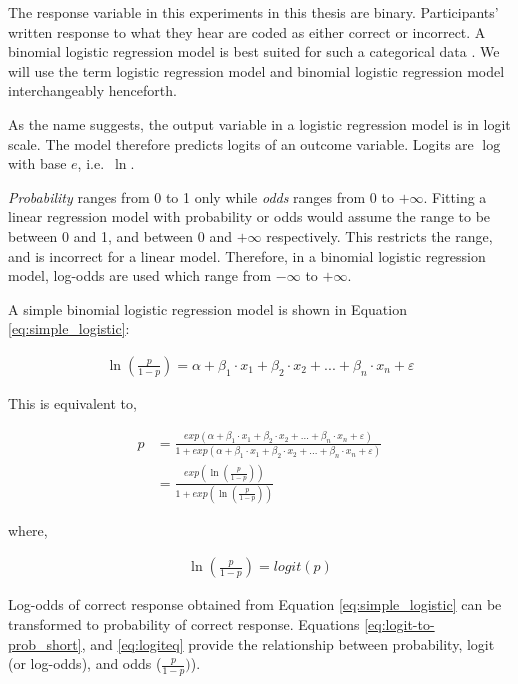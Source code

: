 \documentclass[a4paper, nobind]{templates/ociamthesis}
\begin{document}
The response variable in this experiments in this thesis are binary.
Participants' written response to what they hear are coded as either correct or incorrect.
A binomial logistic regression model is best suited for such a categorical data \autocite{Jaeger2008}.
We will use the term logistic regression model and binomial logistic regression model interchangeably henceforth.

As the name suggests, the output variable in a logistic regression model is in logit scale.
The model therefore predicts logits of an outcome variable.
Logits are \(\log\) with base \(e\), i.e.~\(\ln\).

\emph{Probability} ranges from 0 to 1 only while \emph{odds} ranges from 0 to \(+\infty\).
Fitting a linear regression model with probability or odds would assume the range to be between 0 and 1, and between 0 and \(+\infty\) respectively.
This restricts the range, and is incorrect for a linear model.
Therefore, in a binomial logistic regression model, log-odds are used which range from \(-\infty\) to \(+\infty\).

A simple binomial logistic regression model is shown in Equation \ref{eq:simple_logistic}:

\begin{align} \label{eq:simple_logistic}
\ln(\frac{p}{1-p}) =
\alpha + 
\beta_{1}\cdot{x_1} + 
\beta_{2}\cdot{x_2} + ... +
\beta_{n}\cdot{x_n} + \varepsilon
\end{align}

This is equivalent to,

\begin{align} \label{eq:logit-to-prob_long}
p &=
{\frac{exp(\alpha + 
\beta_{1}\cdot{x_1} + 
\beta_{2}\cdot{x_2} + ... +
\beta_{n}\cdot{x_n} + \varepsilon)}
{1 + exp (\alpha + 
\beta_{1}\cdot{x_1} + 
\beta_{2}\cdot{x_2} + ... +
\beta_{n}\cdot{x_n} + \varepsilon)}}\\ \label{eq:logit-to-prob_short}
&= {\frac{exp(\ln(\frac{p}{1-p}))}{1 + exp (\ln(\frac{p}{1-p}))}}
\end{align}

where,

\begin{align} \label{eq:logiteq}
\ln(\frac{p}{1-p}) =
{logit}(p)
\end{align}

Log-odds of correct response obtained from Equation \ref{eq:simple_logistic} can be transformed to probability of correct response. Equations \ref{eq:logit-to-prob_short}, and \ref{eq:logiteq} provide the relationship between probability, logit (or log-odds), and odds (\(\frac{p}{1-p})\)).
\end{document}
